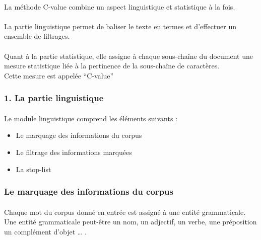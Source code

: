 \documentclass[12pt, a4paper, oneside]{book}
\begin{document}
\paragraph{}
La méthode C-value combine un aspect linguistique et statistique à la fois.
\paragraph{}
La partie linguistique permet de baliser le texte en termes et d'effectuer un ensemble de filtrages. 
\paragraph{}
Quant à la partie statistique, elle assigne à chaque sous-chaîne du document une mesure statistique liée à la pertinence de la sous-chaîne de caractères.\\
Cette mesure est appelée “C-value”

\subsubsection{1. La partie linguistique}
\paragraph{}
Le module linguistique comprend les éléments suivants : \\
\begin{itemize}
\item Le marquage des informations du corpus\\
\item Le filtrage des informations marquées\\
\item La stop-list\\

\end{itemize}


\subsubsection{Le marquage des informations du corpus}
\paragraph{}
Chaque mot du corpus donné en entrée est assigné à une entité grammaticale.\\
Une entité grammaticale peut-être un nom, un adjectif, un verbe, une préposition un complément d'objet … .
\end{document}

